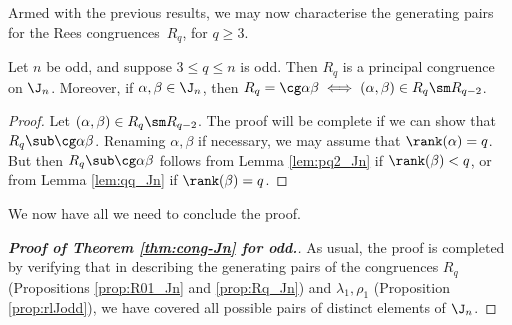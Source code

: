 Armed with the previous results, we may now characterise the generating pairs for the Rees congruences~$R_q$, for $q\geq3$.




\begin{proposition}\label{prop:Rq_Jn}
Let $n$ be odd, and suppose $3\leq q\leq n$ is odd.  Then $R_q$ is a principal congruence on $\J_n$.  Moreover, if $\alpha,\beta\in\J_n$, then $R_q=\cg\alpha\beta\iff(\alpha,\beta)\in R_q\sm R_{q-2}$.
\end{proposition}

\begin{proof} Let $(\alpha,\beta)\in R_q\sm R_{q-2}$.  The proof will be complete if we can show that $R_q\sub\cg\alpha\beta$.  Renaming $\alpha,\beta$ if necessary, we may assume that $\rank(\alpha)=q$.  But then $R_q\sub\cg\alpha\beta$ follows from Lemma \ref{lem:pq2_Jn} if $\rank(\beta)<q$, or from Lemma \ref{lem:qq_Jn} if $\rank(\beta)=q$. \end{proof}

We now have all we need to conclude the proof.

\begin{proof}[{\bf Proof of Theorem \ref{thm:cong-Jn} for  odd.}]
As usual, the proof is completed by verifying that in describing the generating pairs of the congruences $R_q$
(Propositions \ref{prop:R01_Jn} and \ref{prop:Rq_Jn}) and $\lambda_1,\rho_1$
(Proposition \ref{prop:rlJodd}), we have covered all possible pairs of distinct elements of $\J_n$.
\end{proof}

